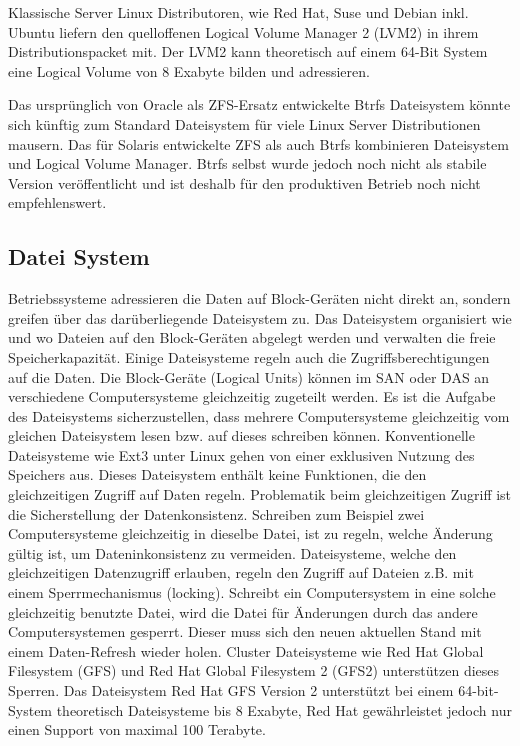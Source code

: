 Klassische Server Linux Distributoren, wie Red Hat, Suse und Debian inkl. Ubuntu liefern den quelloffenen Logical Volume Manager 2 (LVM2) in ihrem Distributionspacket mit. Der LVM2 kann theoretisch auf einem 64-Bit System eine Logical Volume von 8 Exabyte bilden und adressieren. \cite{Levine2009}

Das ursprünglich von Oracle als ZFS-Ersatz entwickelte Btrfs Dateisystem könnte sich künftig zum Standard Dateisystem für viele Linux Server Distributionen mausern. Das für Solaris entwickelte ZFS als auch Btrfs kombinieren Dateisystem und Logical Volume Manager. Btrfs selbst wurde jedoch noch nicht als stabile Version veröffentlicht und ist deshalb für den produktiven Betrieb noch nicht empfehlenswert. \cite{Redler2011}


\subsection{Datei System}
Betriebssysteme adressieren die Daten auf Block-Geräten nicht direkt an, sondern greifen über das darüberliegende Dateisystem zu. Das Dateisystem organisiert wie und wo Dateien auf den Block-Geräten abgelegt werden und verwalten die freie Speicherkapazität. Einige Dateisysteme regeln auch die Zugriffsberechtigungen auf die Daten. Die Block-Geräte (Logical Units) können im SAN oder DAS an verschiedene Computersysteme gleichzeitig zugeteilt werden. Es ist die Aufgabe des Dateisystems sicherzustellen, dass mehrere Computersysteme gleichzeitig vom gleichen Dateisystem lesen bzw. auf dieses schreiben können. Konventionelle Dateisysteme wie Ext3 unter Linux gehen von einer exklusiven Nutzung des Speichers aus. Dieses Dateisystem enthält keine Funktionen, die den gleichzeitigen Zugriff auf Daten regeln. Problematik beim gleichzeitigen Zugriff ist die Sicherstellung der Datenkonsistenz. Schreiben zum Beispiel zwei Computersysteme gleichzeitig in dieselbe Datei, ist zu regeln, welche Änderung gültig ist, um Dateninkonsistenz zu vermeiden. Dateisysteme, welche den gleichzeitigen Datenzugriff erlauben, regeln den Zugriff auf Dateien z.B. mit einem Sperrmechanismus (locking). Schreibt ein Computersystem in eine solche gleichzeitig benutzte Datei, wird die Datei für Änderungen durch das andere Computersystemen gesperrt. Dieser muss sich den neuen aktuellen Stand mit einem Daten-Refresh wieder holen. Cluster Dateisysteme wie Red Hat Global Filesystem (GFS) und Red Hat Global Filesystem 2 (GFS2) unterstützen dieses Sperren. Das Dateisystem Red Hat GFS Version 2 unterstützt bei einem 64-bit-System theoretisch Dateisysteme bis 8 Exabyte, Red Hat gewährleistet jedoch nur einen Support von maximal 100 Terabyte. \cite{Levine2011}


